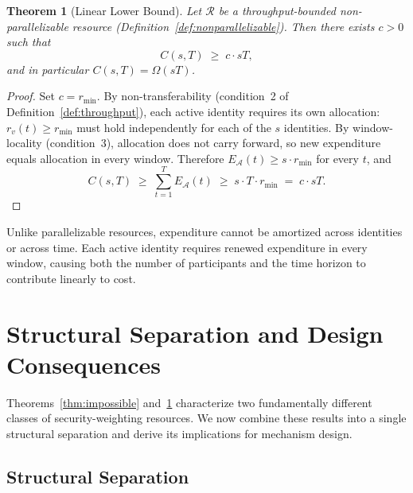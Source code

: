 \documentclass[manuscript,review]{acmart}
\newtheorem{theorem}{Theorem}[section]
\theoremstyle{remark}
\begin{document}
	\begin{theorem}[Linear Lower Bound]
		\label{thm:linear}
		Let $\mathcal{R}$ be a throughput-bounded
		non-parallelizable resource
		(Definition~\ref{def:nonparallelizable}).
		Then there exists $c > 0$ such that
		\begin{equation}
			C(s, T) \;\geq\; c \cdot sT,
		\end{equation}
		and in particular $C(s,T) = \Omega(sT)$.
	\end{theorem}
	
	\begin{proof}
		Set $c = r_{\min}$.
		By non-transferability (condition~2 of
		Definition~\ref{def:throughput}), each active identity
		requires its own allocation: $r_v(t) \geq r_{\min}$
		must hold independently for each of the $s$ identities.
		By window-locality (condition~3), allocation does not
		carry forward, so new expenditure equals allocation
		in every window.
		Therefore $E_{\mathcal{A}}(t) \geq s \cdot r_{\min}$
		for every $t$, and
		\begin{equation}
			C(s, T) \;\geq\; \sum_{t=1}^{T} E_{\mathcal{A}}(t)
			\;\geq\; s \cdot T \cdot r_{\min}
			\;=\; c \cdot sT.
		\end{equation}
	\end{proof}
	
	Unlike parallelizable resources, expenditure cannot
	be amortized across identities or across time.
	Each active identity requires renewed expenditure
	in every window, causing both the number of
	participants and the time horizon to contribute
	linearly to cost.
	
	\section{Structural Separation and Design Consequences}
	\label{sec:separation}
	
	Theorems~\ref{thm:impossible} and~\ref{thm:linear}
	characterize two fundamentally different classes of
	security-weighting resources.
	We now combine these results into a single structural
	separation and derive its implications for mechanism
	design.
	
	\subsection{Structural Separation}
	\label{ssec:separation_theorem}
	
\end{document}
